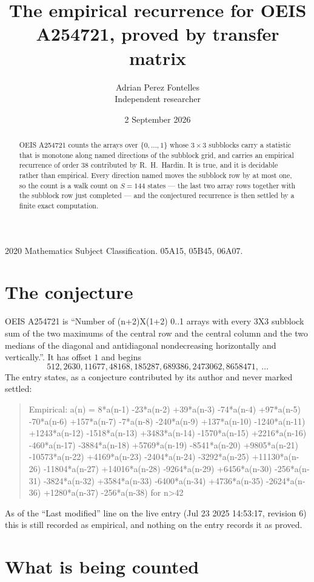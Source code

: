 \documentclass[11pt,a4paper]{article}
\title{The empirical recurrence for OEIS A254721, proved by transfer matrix}
\author{Adrian Perez Fontelles\\ \small Independent researcher}
\date{2 September 2026}
\theoremstyle{plain}
\theoremstyle{definition}
\begin{document}
\maketitle

\begin{abstract}
OEIS A254721 counts the arrays over $\{0,\dots,1\}$ whose $3\times3$ subblocks carry a
statistic that is monotone along named directions of the subblock grid, and carries an
empirical recurrence of order $38$ contributed by R.~H.~Hardin. It is true, and it is
decidable rather than empirical. Every direction named moves the subblock row by at most one,
so the count is a walk count on $S=144$ states --- the last two array rows together with the
subblock row just completed --- and the conjectured recurrence is then settled by a finite
exact computation.
\end{abstract}

\noindent\small 2020 Mathematics Subject Classification. 05A15, 05B45, 06A07.\normalsize

\section{The conjecture}

OEIS A254721 is ``Number of (n+2)X(1+2) 0..1 arrays with every 3X3 subblock sum of the two maximums of the central row and the central column and the two medians of the diagonal and antidiagonal nondecreasing horizontally and vertically.''. It has offset $1$ and begins
\[
512, 2630, 11677, 48168, 185287, 689386, 2473062, 8658471,\ \dots
\]
The entry states, as a conjecture contributed by its author and never marked settled:
\begin{quote}
Empirical: a(n) = 8*a(n-1) -23*a(n-2) +39*a(n-3) -74*a(n-4) +97*a(n-5) -70*a(n-6) +157*a(n-7) -7*a(n-8) -240*a(n-9) +137*a(n-10) -1240*a(n-11) +1243*a(n-12) -1518*a(n-13) +3483*a(n-14) -1570*a(n-15) +2216*a(n-16) -460*a(n-17) -3884*a(n-18) +5769*a(n-19) -8541*a(n-20) +9805*a(n-21) -10573*a(n-22) +4169*a(n-23) -2404*a(n-24) -3292*a(n-25) +11130*a(n-26) -11804*a(n-27) +14016*a(n-28) -9264*a(n-29) +6456*a(n-30) -256*a(n-31) -3824*a(n-32) +3584*a(n-33) -6400*a(n-34) +4736*a(n-35) -2624*a(n-36) +1280*a(n-37) -256*a(n-38) for n>42
\end{quote}
As of the ``Last modified'' line on the live entry (Jul 23 2025 14:53:17, revision 6) this is still
recorded as empirical, and nothing on the entry records it as proved.

\section{What is being counted}
\end{document}
